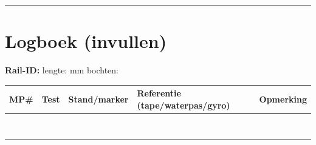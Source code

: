 \documentclass[10pt,a4paper]{article}
\begin{document}
\vspace{2pt}\hrule\vspace{4pt}

\section*{Logboek (invullen)}
\textbf{Rail-ID:} \underline{\hspace{3cm}} \quad lengte: \underline{\hspace{2cm}} mm \quad bochten: \underline{\hspace{4cm}}

\vspace{4pt}
\begin{tabular}{|c|c|c|p{3.2cm}|p{3.6cm}|}
\hline
\textbf{MP\#} & \textbf{Test} & \textbf{Stand/marker} & \textbf{Referentie (tape/waterpas/gyro)} & \textbf{Opmerking} \\
\hline
&&&& \\ \hline
&&&& \\ \hline
&&&& \\ \hline
&&&& \\ \hline
&&&& \\ \hline
&&&& \\ \hline
&&&& \\ \hline
&&&& \\ \hline
\end{tabular}
\end{document}
